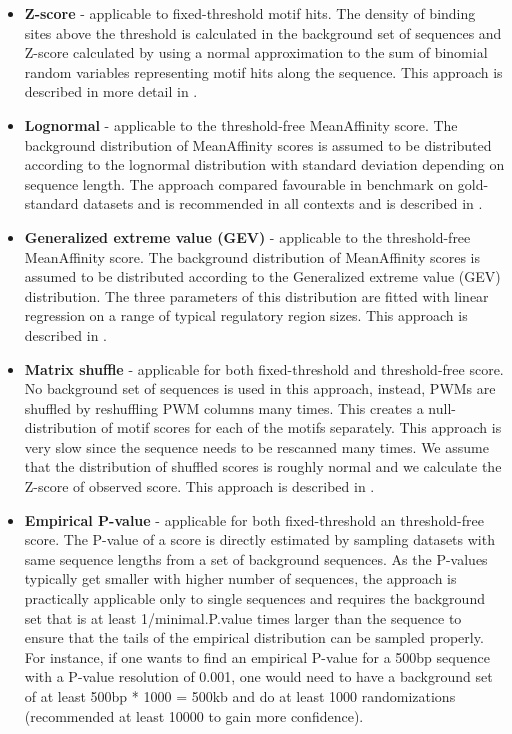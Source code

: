 \documentclass{article}
\begin{document}
\begin{itemize}
	\item \textbf{Z-score} - applicable to fixed-threshold motif hits. The density of binding sites above the threshold is calculated in the background set of sequences and Z-score calculated by using a normal approximation to the sum of binomial random variables representing motif hits along the sequence. This approach is described in more detail in \citep{sui2005opossum}. 
	\item \textbf{Lognormal} - applicable to the threshold-free MeanAffinity score. The background distribution of MeanAffinity scores is assumed to be distributed according to the lognormal distribution with standard deviation depending on sequence length. The approach compared favourable in benchmark on gold-standard datasets and is recommended in all contexts and is described in \citep{stojnic_2012}. 
	\item \textbf{Generalized extreme value (GEV)} - applicable to the threshold-free MeanAffinity score. The background distribution of MeanAffinity scores is assumed to be distributed according to the Generalized extreme value (GEV) distribution. The three parameters of this distribution are fitted with linear regression on a range of typical regulatory region sizes. This approach is described in \citep{manke2008statistical}.
	\item \textbf{Matrix shuffle} - applicable for both fixed-threshold and threshold-free score. No background set of sequences is used in this approach, instead, PWMs are shuffled by reshuffling PWM columns many times. This creates a null-distribution of motif scores for each of the motifs separately. This approach is very slow since the sequence needs to be rescanned many times. We assume that the distribution of shuffled scores is roughly normal and we calculate the Z-score of observed score. This approach is described in \citep{boden2008associating}.
	\item \textbf{Empirical P-value} - applicable for both fixed-threshold an threshold-free score. The P-value of a score is directly estimated by sampling datasets with same sequence lengths from a set of background sequences. As the P-values typically get smaller with higher number of sequences, the approach is practically applicable only to single sequences and requires the background set that is at least 1/minimal.P.value times larger than the sequence to ensure that the tails of the empirical distribution can be sampled properly. For instance, if one wants to find an empirical P-value for a 500bp sequence with a P-value resolution of 0.001, one would need to have a background set of at least 500bp * 1000 = 500kb and do at least 1000 randomizations (recommended at least 10000 to gain more confidence). 
\end{itemize}
\end{document}
